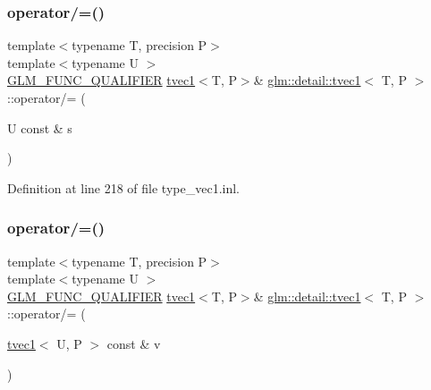 \mbox{\label{structglm_1_1detail_1_1tvec1_ab1e87f461bbf279b20fc1e242b6e9f53}} 
\subsubsection{\texorpdfstring{operator/=()}{operator/=()}\hspace{0.1cm}{\footnotesize\ttfamily [3/4]}}
{\footnotesize\ttfamily template$<$typename T, precision P$>$ \\
template$<$typename U $>$ \\
\hyperlink{setup_8hpp_a33fdea6f91c5f834105f7415e2a64407}{G\+L\+M\+\_\+\+F\+U\+N\+C\+\_\+\+Q\+U\+A\+L\+I\+F\+I\+ER} \hyperlink{structglm_1_1detail_1_1tvec1}{tvec1}$<$T, P$>$\& \hyperlink{structglm_1_1detail_1_1tvec1}{glm\+::detail\+::tvec1}$<$ T, P $>$\+::operator/= (\begin{DoxyParamCaption}\item[{U const \&}]{s }\end{DoxyParamCaption})}



Definition at line 218 of file type\+\_\+vec1.\+inl.

\mbox{\label{structglm_1_1detail_1_1tvec1_a76603a1972a31cd51a5281e3794ae2e3}} 
\subsubsection{\texorpdfstring{operator/=()}{operator/=()}\hspace{0.1cm}{\footnotesize\ttfamily [4/4]}}
{\footnotesize\ttfamily template$<$typename T, precision P$>$ \\
template$<$typename U $>$ \\
\hyperlink{setup_8hpp_a33fdea6f91c5f834105f7415e2a64407}{G\+L\+M\+\_\+\+F\+U\+N\+C\+\_\+\+Q\+U\+A\+L\+I\+F\+I\+ER} \hyperlink{structglm_1_1detail_1_1tvec1}{tvec1}$<$T, P$>$\& \hyperlink{structglm_1_1detail_1_1tvec1}{glm\+::detail\+::tvec1}$<$ T, P $>$\+::operator/= (\begin{DoxyParamCaption}\item[{\hyperlink{structglm_1_1detail_1_1tvec1}{tvec1}$<$ U, P $>$ const \&}]{v }\end{DoxyParamCaption})}



